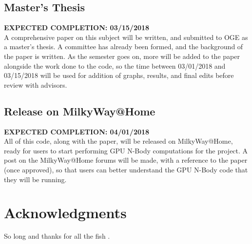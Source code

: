 \documentclass[fleqn,10pt]{SelfArx} %
\begin{document}
\subsection{Master's Thesis}
\textbf{EXPECTED COMPLETION: 03/15/2018}\\
A comprehensive paper on this subject will be written, and submitted to OGE as a master's thesis. A committee has already been formed, and the background of the paper is written. As the semester goes on, more will be added to the paper alongside the work done to the code, so the time between 03/01/2018 and 03/15/2018 will be used for addition of graphs, results, and final edits before review with advisors.

\subsection{Release on MilkyWay@Home}
\textbf{EXPECTED COMPLETION: 04/01/2018}\\
All of this code, along with the paper, will be released on MilkyWay@Home, ready for users to start performing GPU N-Body computations for the project. A post on the MilkyWay@Home forums will be made, with a reference to the paper (once approved), so that users can better understand the GPU N-Body code that they will be running.

\section*{Acknowledgments} %


So long and thanks for all the fish \cite{Karras:2012}.




\end{document}
